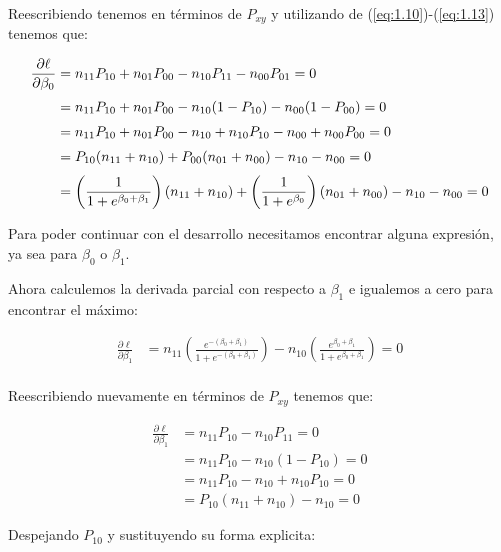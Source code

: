 Reescribiendo tenemos en términos de $P_{xy}$ y utilizando de (\ref{eq:1.10})-(\ref{eq:1.13}) tenemos que:

\begin{align}
    \frac{\partial\ell}{\partial\beta_0} &= n_{11}P_{10} + n_{01}P_{00} - n_{10}P_{11} - n_{00}P_{01} = 0 \notag \\[0.1cm]
    &= n_{11}P_{10} + n_{01}P_{00} - n_{10}(1-P_{10}) - n_{00}(1-P_{00}) = 0 \notag \\[0.1cm]
    &= n_{11}P_{10} + n_{01}P_{00} - n_{10} + n_{10}P_{10} - n_{00} + n_{00}P_{00} = 0 \notag \\[0.1cm]
    &=P_{10}(n_{11} + n_{10}) + P_{00}(n_{01} + n_{00}) - n_{10} - n_{00} = 0 \notag \\[0.1cm]
    &= \left(\frac{1}{1+e^{\beta_0 + \beta_1}}\right) (n_{11} + n_{10}) + \left(\frac{1}{1+e^{\beta_0}}\right)(n_{01} + n_{00}) - n_{10} - n_{00} = 0 
    \label{eq:1.15}
\end{align}

Para poder continuar con el desarrollo necesitamos encontrar alguna expresión, ya sea para $\beta_0$ o $\beta_1$.

\newpage
Ahora calculemos la derivada parcial con respecto a $\beta_1$ e igualemos a cero para encontrar el máximo:

\begin{align*}
    \frac{\partial\ell}{\partial\beta_1} &= n_{11} \left(\frac{e^{-(\beta_0+\beta_1)}}{1 + e^{-(\beta_0 + \beta_1)}}\right) - n_{10} \left(\frac{e^{\beta_0 + \beta_1}}{1 + e^{\beta_0 + \beta_1}}\right) = 0 \\[0.1cm]
\end{align*}

Reescribiendo nuevamente en términos de $P_{xy}$ tenemos que:

\begin{align*}
    \frac{\partial\ell}{\partial\beta_1} &= n_{11}P_{10} - n_{10}P_{11} = 0 \\[0.1cm]
    &= n_{11}P_{10} - n_{10}(1-P_{10}) = 0 \\[0.1cm]
    &= n_{11}P_{10} -  n_{10} +  n_{10}P_{10} = 0 \\[0.1cm]
    &= P_{10}(n_{11} + n_{10}) -  n_{10} = 0
\end{align*}

Despejando $P_{10}$ y sustituyendo su forma explicita:

